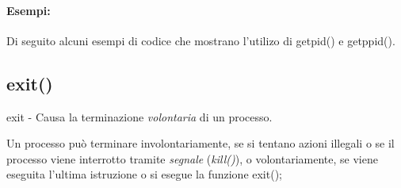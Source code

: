 \documentclass
[10pt,        %
 a4paper,     %
 onecolumn,   %
 fleqn,       %
 twoside,     %
 notitlepage, %
 openany      %
]{article}    %
\begin{document}
\paragraph{Esempi:}
Di seguito alcuni esempi di codice che mostrano l'utilizo di getpid() e getppid().



\subsection{exit()}
exit - Causa la terminazione \textit{volontaria} di un processo.

Un processo può terminare involontariamente, se si tentano azioni illegali o se il processo viene interrotto tramite \textit{segnale} (\textit{kill()}), o volontariamente, se viene eseguita l'ultima istruzione o si esegue la funzione exit();
\end{document}
